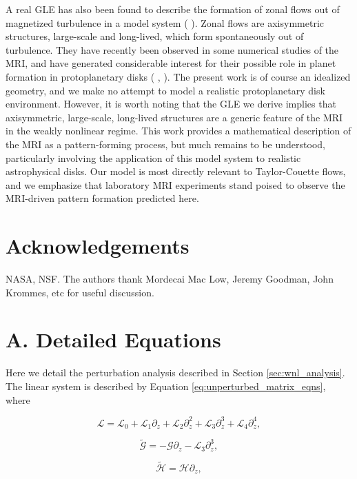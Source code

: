 \documentclass{emulateapj}
\newcommand{\beq}{\begin{equation}}
\newcommand{\eeq}{\end{equation}}
\newcommand{\citei}[1]{\citeauthor{#1} \citeyear{#1}}
\begin{document}
A real GLE has also been found to describe the formation of zonal flows out of magnetized turbulence in a model system (\citei{Parker:2013hy}). Zonal flows are axisymmetric structures, large-scale and long-lived, which form spontaneously out of turbulence. They have recently been observed in some numerical studies of the MRI, and have generated considerable interest for their possible role in planet formation in protoplanetary disks (\citei{Johansen:2009uj}, \citei{Kunz:2013}). The present work is of course an idealized geometry, and we make no attempt to model a realistic protoplanetary disk environment. However, it is worth noting that the GLE we derive implies that axisymmetric, large-scale, long-lived structures are a generic feature of the MRI in the weakly nonlinear regime. This work provides a mathematical description of the MRI as a pattern-forming process, but much remains to be understood, particularly involving the application of this model system to realistic astrophysical disks. Our model is most directly relevant to Taylor-Couette flows, and we emphasize that laboratory MRI experiments stand poised to observe the MRI-driven pattern formation predicted here. 

\section{Acknowledgements}
NASA, NSF. The authors thank Mordecai Mac Low, Jeremy Goodman, John Krommes, etc for useful discussion.



\clearpage
\appendix

\section{A. Detailed Equations}\label{app:basic_equations}

Here we detail the perturbation analysis described in Section \ref{sec:wnl_analysis}. The linear system is described by Equation \ref{eq:unperturbed_matrix_eqns}, where 

\beq
\mathcal{L} = \mathcal{L}_0 + \mathcal{L}_1 \partial_z + \mathcal{L}_2 \partial_z^2 + \mathcal{L}_3 \partial_z^3 + \mathcal{L}_4 \partial_z^4,
\eeq

\beq
\widetilde{\mathcal{G}} = - \mathcal{G} \partial_z - \mathcal{L}_3 \partial_z^3,
\eeq

\beq
\widetilde{\mathcal{H}} = \mathcal{H} \partial_z,
\eeq
\end{document}
